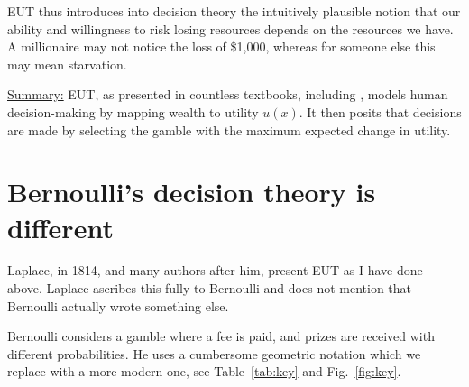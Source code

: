 \documentclass[final]{ectaart}
\newcommand{\tref}[1]{Table~\ref{tab:#1}}
\newcommand{\fref}[1]{Fig.~\ref{fig:#1}}
\newcommand{\seclabel}[1]{\label{section:#1}}
\theoremstyle{plain}
\begin{document}
EUT thus introduces into decision theory the intuitively plausible notion that our ability and willingness to risk losing resources depends on the resources we have. A millionaire may not notice the loss of \$1,000, whereas for someone else this may mean starvation.

\underline{Summary:} EUT, as presented in countless textbooks, including \citep{Laplace1814,vonNeumannMorgenstern1944}, models human decision-making by mapping wealth to utility $u(x)$. It then posits that decisions are made by selecting the gamble with the maximum expected change in utility. 

\section{Bernoulli's decision theory is different}
\seclabel{Bernoullis}
Laplace, in 1814, and many authors after him, present EUT as I have done above. Laplace ascribes this fully to Bernoulli and does not mention that Bernoulli actually wrote something else. 

Bernoulli considers a gamble where a fee is paid, and prizes are received with different probabilities. He uses a cumbersome geometric notation which we replace with a more modern one, see \tref{key} and \fref{key}.
\end{document}
